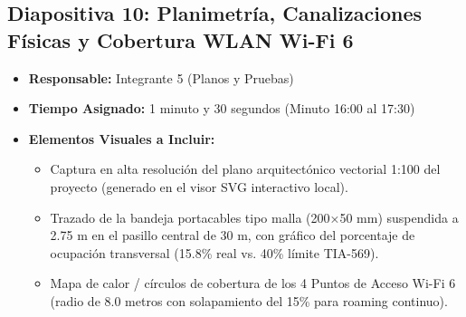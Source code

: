\documentclass[11pt,a4paper]{article}
\begin{document}
\vspace{0.5cm}

\subsection{Diapositiva 10: Planimetría, Canalizaciones Físicas y Cobertura WLAN Wi-Fi 6}
\begin{itemize}[leftmargin=*]
    \item \textbf{Responsable:} Integrante 5 (Planos y Pruebas)
    \item \textbf{Tiempo Asignado:} 1 minuto y 30 segundos (Minuto 16:00 al 17:30)
    \item \textbf{Elementos Visuales a Incluir:}
    \begin{itemize}
        \item Captura en alta resolución del plano arquitectónico vectorial 1:100 del proyecto (generado en el visor SVG interactivo local).
        \item Trazado de la bandeja portacables tipo malla (200×50 mm) suspendida a 2.75 m en el pasillo central de 30 m, con gráfico del porcentaje de ocupación transversal (15.8\% real vs. 40\% límite TIA-569).
        \item Mapa de calor / círculos de cobertura de los 4 Puntos de Acceso Wi-Fi 6 (radio de 8.0 metros con solapamiento del 15\% para roaming continuo).
    \end{itemize}
\end{itemize}
\end{document}
